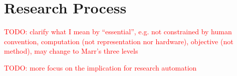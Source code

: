 \documentclass{book}
\begin{document}
\section{Research Process}

\textcolor{red}{TODO: clarify what I mean by ``essential'', e.g. not constrained by human convention, computation (not representation nor hardware), objective (not method), may change to Marr's three levels}

\textcolor{red}{TODO: more focus on the implication for research automation}






\end{document}
